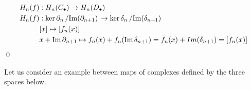 \documentclass[11pt,a4paper]{report}
\DeclareMathOperator{\Ima}{Im}
\begin{document}
                \begin{align*}
                   H_n(f) &:  H_n(C_\bullet) \rightarrow H_n(D_\bullet)  \\
                   H_n(f) &:  \ker{\partial_n} \left/ \Ima(\partial_{n+1}) \right. \rightarrow \ker{\delta_n} \left/ \Ima(\delta_{n+1}) \right. \\
                             & [x] \mapsto [f_n(x)] \\
                             & x + \Ima\partial_{n+1} \mapsto f_n(x) + f_n(\Ima\delta_{n+1}) =  f_n(x) + Im(\delta_{n+1}) = [f_n(x)] 
                \end{align*} \qed

                Let us consider an example between maps of complexes defined by the three spaces below.
               
               
               
\end{document}

